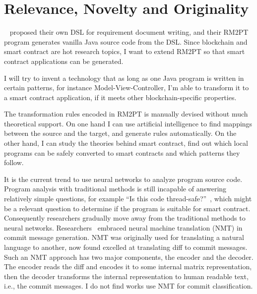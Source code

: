 \section{Relevance, Novelty and Originality}

~\cite{yang2019automated} proposed their own DSL for requirement document writing,  and their RM2PT program generates vanilla Java source code from the DSL. Since blockchain and smart contract are hot research topics, I want to extend RM2PT so that smart contract applications can be generated.


I will try to invent a technology that as long as one Java program is written in certain patterns, for instance Model-View-Controller, I'm able to transform it to a smart contract application, if it meets other blockchain-specific properties.

The transformation rules encoded in RM2PT is manually devised without much theoretical support. On one hand I can use artificial intelligence to find mappings between the source and the target, and generate rules automatically. On the other hand, I can study the theories behind smart contract, find out which local programs can be safely converted to smart contracts and which patterns they follow.



It is the current trend to use neural networks to analyze program source code.
Program analysis with traditional methods is still incapable of answering relatively simple questions, for example
 ``Is this code thread-safe?''~\cite{alexandru2017replicating},
which might be a relevant question to determine if the program is suitable for smart contract.
Consequently researchers gradually move away from the traditional methods to neural networks.
Researchers~\cite{xu2019commit,liu2019generating} embraced neural machine translation (NMT) in commit message generation.
NMT was originally used for translating a natural language to another, now found excelled at translating diff to commit messages.
Such an NMT approach has two major components, the encoder and the decoder.
The encoder reads the diff and encodes it to some internal matrix representation,
then the decoder transforms the internal representation to human readable text, i.e., the commit messages.
I do not find works use NMT for commit classification.


